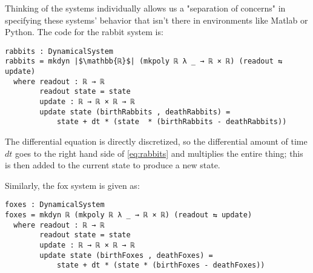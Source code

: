 
Thinking of the systems individually allows us a "separation of concerns" in specifying these systems' behavior that isn't there in environments like Matlab or Python. The code for the rabbit system is:
\begin{verbatim}
rabbits : DynamicalSystem
rabbits = mkdyn |$\mathbb{ℝ}$| (mkpoly ℝ λ _ → ℝ × ℝ) (readout ⇆ update)
  where readout : ℝ → ℝ
        readout state = state
        update : ℝ → ℝ × ℝ → ℝ
        update state (birthRabbits , deathRabbits) = 
            state + dt * (state  * (birthRabbits - deathRabbits))
\end{verbatim}
The differential equation is directly discretized, so the differential amount of time $dt$ goes to the right hand side of \ref{eq:rabbits} and multiplies the entire thing; this is then added to the current state to produce a new state.

Similarly, the fox system is given as:
\begin{verbatim}
foxes : DynamicalSystem
foxes = mkdyn ℝ (mkpoly ℝ λ _ → ℝ × ℝ) (readout ⇆ update)
  where readout : ℝ → ℝ
        readout state = state
        update : ℝ → ℝ × ℝ → ℝ
        update state (birthFoxes , deathFoxes) = 
            state + dt * (state * (birthFoxes - deathFoxes))
\end{verbatim}

